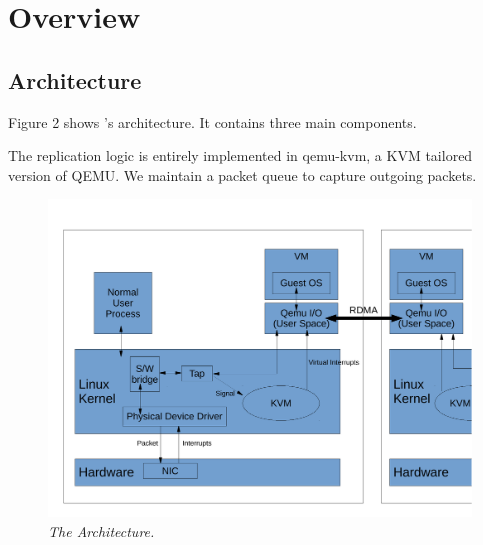 \section{\xxx Overview} \label{sec:overview}

\subsection{Architecture} \label{sec:arch}

Figure 2 shows \xxx's architecture. It contains three main components.


The replication logic is entirely implemented in qemu-kvm, a KVM tailored version of QEMU.
We maintain a packet queue to capture outgoing packets.

\begin{figure}[t]
\centering
\includegraphics[width=.47\textwidth]{figures/arch}
\vspace{-.2in}
\caption{{\em The \xxx Architecture.}} \label{fig:arc}
\vspace{.05in}
\end{figure}
